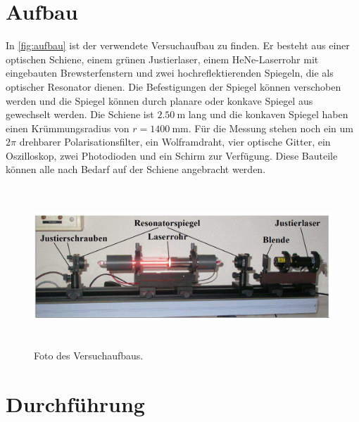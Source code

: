 \section{Aufbau}
\label{sec:Aufbau}
In \autoref{fig:aufbau} ist der verwendete Versuchaufbau zu finden. Er besteht aus einer optischen Schiene, einem
grünen Justierlaser, einem HeNe-Laserrohr mit eingebauten Brewsterfenstern und zwei hochreflektierenden Spiegeln,
die als optischer Resonator dienen. Die Befestigungen der Spiegel können verschoben werden und die Spiegel können
durch planare oder konkave Spiegel aus gewechselt werden. Die Schiene ist $\SI{2,50}{\meter}$ lang und die konkaven
Spiegel haben einen Krümmungsradius von $r=\SI{1400}{\milli\meter}$. Für die Messung stehen noch ein um $2\pi$
drehbarer Polarisationsfilter, ein Wolframdraht, vier optische Gitter, ein Oszilloskop, zwei Photodioden und ein
Schirm zur Verfügung. Diese Bauteile können alle nach Bedarf auf der Schiene angebracht werden.
\begin{figure}
    \centering
    \includegraphics[height=6cm]{content/pics/aufbau.png}
    \caption{Foto des Versuchaufbaus.}
    \label{fig:aufbau}
\end{figure}

\section{Durchführung}
\label{sec:Durchführung}
